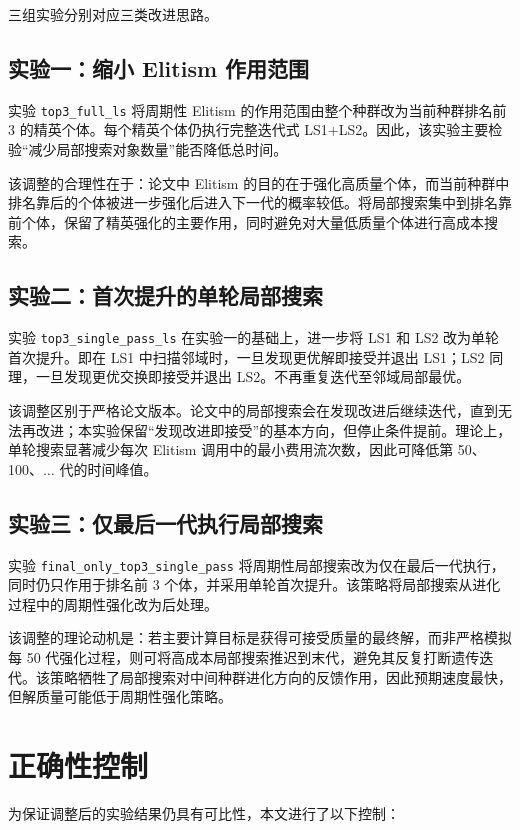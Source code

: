 \documentclass{article}
\begin{document}
三组实验分别对应三类改进思路。

\subsection{实验一：缩小 Elitism 作用范围}

实验 \texttt{top3\_full\_ls} 将周期性 Elitism 的作用范围由整个种群改为当前种群排名前 3 的精英个体。每个精英个体仍执行完整迭代式 LS1+LS2。因此，该实验主要检验“减少局部搜索对象数量”能否降低总时间。

该调整的合理性在于：论文中 Elitism 的目的在于强化高质量个体，而当前种群中排名靠后的个体被进一步强化后进入下一代的概率较低。将局部搜索集中到排名靠前个体，保留了精英强化的主要作用，同时避免对大量低质量个体进行高成本搜索。

\subsection{实验二：首次提升的单轮局部搜索}

实验 \texttt{top3\_single\_pass\_ls} 在实验一的基础上，进一步将 LS1 和 LS2 改为单轮首次提升。即在 LS1 中扫描邻域时，一旦发现更优解即接受并退出 LS1；LS2 同理，一旦发现更优交换即接受并退出 LS2。不再重复迭代至邻域局部最优。

该调整区别于严格论文版本。论文中的局部搜索会在发现改进后继续迭代，直到无法再改进；本实验保留“发现改进即接受”的基本方向，但停止条件提前。理论上，单轮搜索显著减少每次 Elitism 调用中的最小费用流次数，因此可降低第 50、100、$\ldots$ 代的时间峰值。

\subsection{实验三：仅最后一代执行局部搜索}

实验 \texttt{final\_only\_top3\_single\_pass} 将周期性局部搜索改为仅在最后一代执行，同时仍只作用于排名前 3 个体，并采用单轮首次提升。该策略将局部搜索从进化过程中的周期性强化改为后处理。

该调整的理论动机是：若主要计算目标是获得可接受质量的最终解，而非严格模拟每 50 代强化过程，则可将高成本局部搜索推迟到末代，避免其反复打断遗传迭代。该策略牺牲了局部搜索对中间种群进化方向的反馈作用，因此预期速度最快，但解质量可能低于周期性强化策略。

\section{正确性控制}

为保证调整后的实验结果仍具有可比性，本文进行了以下控制：
\end{document}
